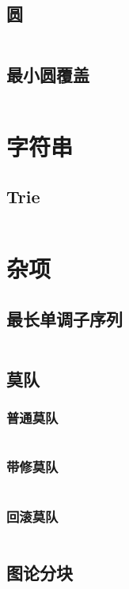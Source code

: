 \documentclass[utf8]{ctexart}
\newcommand{\cpp}[1]{\inputminted[linenos,breaklines,tabsize=4,mathescape]{c++}{#1}}
\begin{document}
\subsection{圆}
\cpp{codes/computational-geometry/circle.cpp}

\subsection{最小圆覆盖}
\cpp{codes/computational-geometry/min-circle-cover.cpp}

\section{字符串}

\subsection{Trie}
\cpp{codes/string/trie.cpp}

\section{杂项}

\subsection{最长单调子序列}
\cpp{codes/misc/lis.cpp}

\subsection{莫队}

\subsubsection{普通莫队}
\cpp{codes/misc/mo.cpp}

\subsubsection{带修莫队}
\cpp{codes/misc/modifiable-mo.cpp}

\subsubsection{回滚莫队}
\cpp{codes/misc/rollback-mo.cpp}

\subsection{图论分块}
\cpp{codes/misc/graph-block.cpp}
\end{document}
